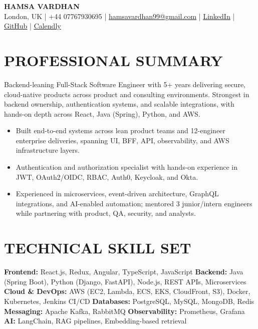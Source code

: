 \documentclass[10pt]{article}
\begin{document}
\begin{center}
{\Large \textbf{HAMSA VARDHAN}}\\[2pt]
London, UK \;|\; +44 07767930695 \;|\;
\href{mailto:hamsavardhan99@gmail.com}{hamsavardhan99@gmail.com} \;|\;
\href{https://linkedin.com/in/hamsa-vardhan}{\underline{LinkedIn}} \;|\;
\href{https://github.com/hamsa-vd}{\underline{GitHub}} \;|\;
\href{https://calendly.com/hamsa-vd/intro-call}{\underline{Calendly}}
\end{center}

\vspace{-2pt}

\section*{PROFESSIONAL SUMMARY}

Backend-leaning Full-Stack Software Engineer with 5+ years delivering secure, cloud-native products across product and consulting environments. Strongest in backend ownership, authentication systems, and scalable integrations, with hands-on depth across React, Java (Spring), Python, and AWS.
\begin{itemize}
  \item Built end-to-end systems across lean product teams and 12-engineer enterprise deliveries, spanning UI, BFF, API, observability, and AWS infrastructure layers.
  \item Authentication and authorization specialist with hands-on experience in JWT, OAuth2/OIDC, RBAC, Auth0, Keycloak, and Okta.
  \item Experienced in microservices, event-driven architecture, GraphQL integrations, and AI-enabled automation; mentored 3 junior/intern engineers while partnering with product, QA, security, and analysts.
\end{itemize}

\section*{TECHNICAL SKILL SET}

\textbf{Frontend:} React.js, Redux, Angular, TypeScript, JavaScript \quad
\textbf{Backend:} Java (Spring Boot), Python (Django, FastAPI), Node.js, REST APIs, Microservices\\
\textbf{Cloud \& DevOps:} AWS (EC2, Lambda, ECS, EKS, CloudFront, S3), Docker, Kubernetes, Jenkins CI/CD \quad
\textbf{Databases:} PostgreSQL, MySQL, MongoDB, Redis\\
\textbf{Messaging:} Apache Kafka, RabbitMQ \quad
\textbf{Observability:} Prometheus, Grafana \quad
\textbf{AI:} LangChain, RAG pipelines, Embedding-based retrieval
\end{document}
